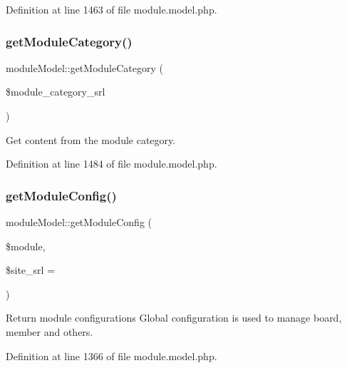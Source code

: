 Definition at line 1463 of file module.\+model.\+php.

\mbox{\label{classmoduleModel_a75669086647f78470306c840c22f36b1}} 
\subsubsection{\texorpdfstring{get\+Module\+Category()}{getModuleCategory()}}
{\footnotesize\ttfamily module\+Model\+::get\+Module\+Category (\begin{DoxyParamCaption}\item[{}]{\$module\+\_\+category\+\_\+srl }\end{DoxyParamCaption})}



Get content from the module category. 



Definition at line 1484 of file module.\+model.\+php.

\mbox{\label{classmoduleModel_ae8005c8ab7ee3b9e6ddd7f71bb2b4698}} 
\subsubsection{\texorpdfstring{get\+Module\+Config()}{getModuleConfig()}}
{\footnotesize\ttfamily module\+Model\+::get\+Module\+Config (\begin{DoxyParamCaption}\item[{}]{\$module,  }\item[{}]{\$site\+\_\+srl = {} }\end{DoxyParamCaption})}



Return module configurations Global configuration is used to manage board, member and others. 



Definition at line 1366 of file module.\+model.\+php.

\mbox{\label{classmoduleModel_a2b22943c4d212c8284ef9780e0ebf3bd}} 
